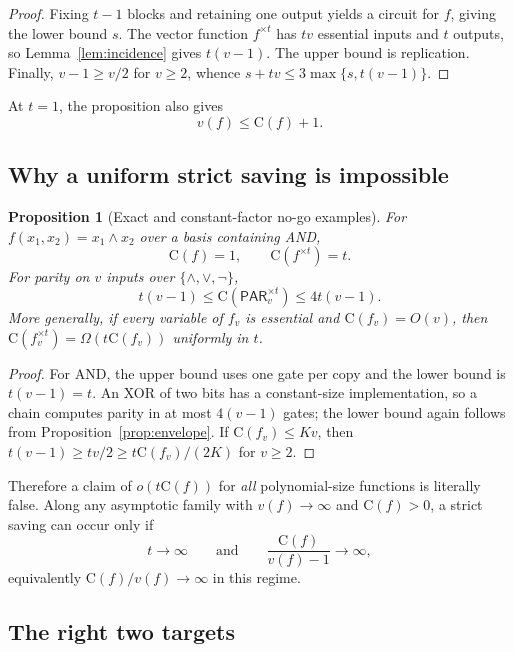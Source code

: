 \documentclass[11pt]{article}
\newtheorem{proposition}[theorem]{Proposition}
\theoremstyle{definition}
\newcommand{\C}{\mathrm{C}}
\begin{document}
\begin{proof}
Fixing $t-1$ blocks and retaining one output yields a circuit for $f$, giving
the lower bound $s$.  The vector function $f^{\times t}$ has $tv$ essential
inputs and $t$ outputs, so Lemma~\ref{lem:incidence} gives $t(v-1)$.  The
upper bound is replication.  Finally, $v-1\ge v/2$ for $v\ge2$, whence
$s+tv\le3\max\{s,t(v-1)\}$.
\end{proof}

At $t=1$, the proposition also gives
\begin{equation}
  v(f)\le \C(f)+1.
  \label{eq:v-vs-s}
\end{equation}

\subsection{Why a uniform strict saving is impossible}

\begin{proposition}[Exact and constant-factor no-go examples]
\label{prop:nogo}
For $f(x_1,x_2)=x_1\wedge x_2$ over a basis containing AND,
\[
  \C(f)=1,\qquad \C(f^{\times t})=t.
\]
For parity on $v$ inputs over $\{\wedge,\vee,\neg\}$,
\[
  t(v-1)\le \C(\mathsf{PAR}_v^{\times t})\le4t(v-1).
\]
More generally, if every variable of $f_v$ is essential and
$\C(f_v)=O(v)$, then $\C(f_v^{\times t})=\Omega(t\C(f_v))$ uniformly in $t$.
\end{proposition}

\begin{proof}
For AND, the upper bound uses one gate per copy and the lower bound is
$t(v-1)=t$.  An XOR of two bits has a constant-size implementation, so a
chain computes parity in at most $4(v-1)$ gates; the lower bound again follows
from Proposition~\ref{prop:envelope}.  If $\C(f_v)\le Kv$, then
$t(v-1)\ge tv/2\ge t\C(f_v)/(2K)$ for $v\ge2$.
\end{proof}

Therefore a claim of $o(t\C(f))$ for \emph{all} polynomial-size functions is
literally false.  Along any asymptotic family with $v(f)\to\infty$ and
$\C(f)>0$, a strict saving can occur only if
\begin{equation}
  t\longrightarrow\infty
  \qquad\text{and}\qquad
  \frac{\C(f)}{v(f)-1}\longrightarrow\infty,
  \label{eq:necessary}
\end{equation}
equivalently $\C(f)/v(f)\to\infty$ in this regime.

\subsection{The right two targets}
\end{document}
